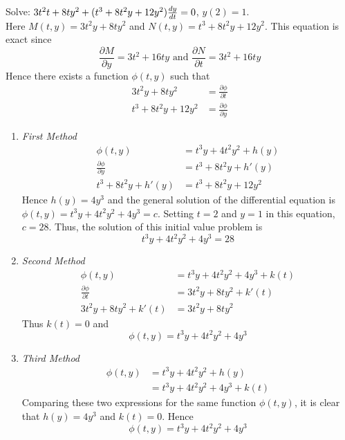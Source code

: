 \documentclass[12pt]{article}
\begin{document}
\begin{example} Solve: $3t^2t + 8ty^2 + (t^3 + 8t^2y + 12y^2)\frac{dy}{dt} = 0$, $y(2) = 1$. \\ Here $M(t, y) = 3t^2y + 8ty^2$ and $N(t, y) = t^3 + 8t^2y + 12y^2$. This equation is exact since $$\frac{\partial M}{\partial y} = 3t^2 + 16ty \text{ and } \frac{\partial N}{\partial t} = 3t^2 + 16ty $$ 
Hence there exists a function $\phi(t, y)$ such that $$\begin{aligned} 3t^2y + 8ty^2 &= \frac{\partial \phi}{\partial t} \\ t^3 + 8t^2y + 12y^2 &= \frac{\partial \phi}{\partial y} \end{aligned} $$ \begin{enumerate} 
\item \textit{First Method} $$\begin{aligned} \phi(t, y) &= t^3y + 4t^2y^2 + h(y) \\ \frac{\partial \phi}{\partial y} &= t^3 + 8t^2y + h'(y) \\ t^3 + 8t^2y + h'(y) &= t^3 + 8t^2y + 12y^2 \end{aligned} $$ Hence $h(y) = 4y^3$ and the general solution of the differential equation is $\phi(t, y) = t^3y + 4t^2y^2 + 4y^3 = c$. Setting $t = 2$ and $y = 1$ in this equation, $c = 28$. Thus, the solution of this initial value problem is $$t^3y + 4t^2y^2 + 4y^3 = 28$$ 
\item \textit{Second Method} $$\begin{aligned} \phi(t, y) &= t^3y + 4t^2y^2 + 4y^3 + k(t) \\ \frac{\partial \phi}{\partial t} &= 3t^2y + 8ty^2 + k'(t) \\ 3t^2y + 8ty^2 + k'(t) &= 3t^2y + 8ty^2 \end{aligned} $$ Thus $k(t) = 0$ and $$\phi(t, y) = t^3y + 4t^2y^2 + 4y^3$$ 
\item \textit{Third Method} $$\begin{aligned} \phi(t, y) &= t^3y + 4t^2y^2 + h(y) \\ &= t^3y + 4t^2y^2 + 4y^3 + k(t) \end{aligned} $$ Comparing these two expressions for the same function $\phi(t, y)$, it is clear that $h(y) = 4y^3$ and $k(t) = 0$. Hence $$\phi(t, y) = t^3y + 4t^2y^2 + 4y^3$$ \end{enumerate} \end{example} 
\end{document}
